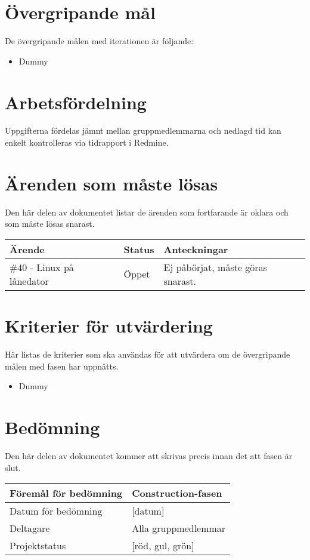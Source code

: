 \section{Övergripande mål}
De övergripande målen med iterationen är följande:

\begin{itemize}
	\item Dummy
\end{itemize}

\section{Arbetsfördelning}
Uppgifterna fördelas jämnt mellan gruppmedlemmarna och nedlagd tid kan enkelt kontrolleras via tidrapport i Redmine.

\section{Ärenden som måste lösas}
Den här delen av dokumentet listar de ärenden som fortfarande är oklara och som måste lösas snarast.

\begin{center}
	\begin{tabular}{| l | l | l |}
		\hline Ärende & Status & Anteckningar \\
		\hline \#40 - Linux på lånedator & Öppet & Ej påbörjat, måste göras snarast. \\
		\hline
	\end{tabular}
\end{center}

\section{Kriterier för utvärdering}
Här listas de kriterier som ska användas för att utvärdera om de övergripande målen med fasen har uppnåtts.

\begin{itemize}
	\item Dummy
\end{itemize}

\section{Bedömning}
Den här delen av dokumentet kommer att skrivas precis innan det att fasen är slut.

\begin{center}
	\begin{tabular}{| l | l |}
		\hline Föremål för bedömning & Construction-fasen \\
		\hline Datum för bedömning & [datum] \\
		\hline Deltagare & Alla gruppmedlemmar \\
		\hline Projektstatus & [röd, gul, grön] \\
		\hline
	\end{tabular}
\end{center}

